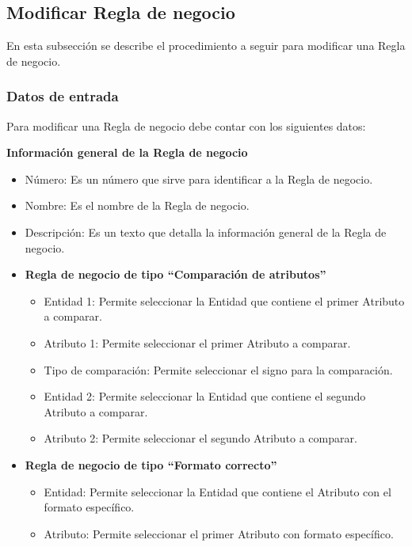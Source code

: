 \subsection{Modificar Regla de negocio}
En esta subsección se describe el procedimiento a seguir para modificar una Regla de negocio.

\subsubsection{Datos de entrada}
\begin{description}
	\item Para modificar una Regla de negocio debe contar con los siguientes datos: \hspace{10pt}
	\begin{description}
	    \item \textbf{Información general de la Regla de negocio}
	    \begin{itemize}
		  \item Número: Es un número que sirve para identificar a la Regla de negocio.
		  \item Nombre: Es el nombre de la Regla de negocio.
		  \item Descripción: Es un texto que detalla la información general de la Regla de negocio.
		  \item \textbf{Regla de negocio de tipo ``Comparación de atributos''}
		  \begin{itemize}
			\item Entidad 1: Permite seleccionar la Entidad que contiene el primer Atributo a comparar.
			\item Atributo 1: Permite seleccionar el primer Atributo a comparar.
			\item Tipo de comparación: Permite seleccionar el signo para la comparación.
			\item Entidad 2: Permite seleccionar la Entidad que contiene el segundo Atributo a comparar.
			\item Atributo 2: Permite seleccionar el segundo Atributo a comparar.
		  \end{itemize}
		  \item \textbf{Regla de negocio de tipo ``Formato correcto''}
		  \begin{itemize}
			\item Entidad: Permite seleccionar la Entidad que contiene el Atributo con el formato específico.
			\item Atributo: Permite seleccionar el primer Atributo con formato específico.

\end{itemize}
\end{itemize}
\end{description}
\end{description}
